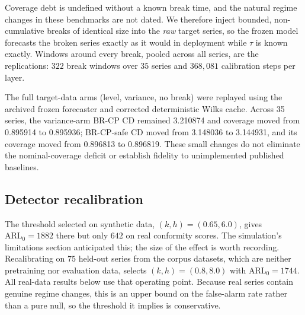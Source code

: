 \documentclass[10pt]{article}
\begin{document}
Coverage debt is undefined without a known break time, and the natural regime
changes in these benchmarks are not dated. We therefore inject bounded,
non-cumulative breaks of identical size into the \emph{raw} target series, so
the frozen model forecasts the broken series exactly as it would in deployment
while $\tau$ is known exactly. Windows around every break, pooled across all
series, are the replications: $322$ break windows over $35$ series and
$368{,}081$ calibration steps per layer.

The full target-data arms (level, variance, no break) were replayed using the archived frozen forecaster and corrected deterministic Wilks cache. Across 35 series, the variance-arm BR-CP CD remained 3.210874 and coverage moved from 0.895914 to 0.895936; BR-CP-safe CD moved from 3.148036 to 3.144931, and its coverage moved from 0.896813 to 0.896819. These small changes do not eliminate the nominal-coverage deficit or establish fidelity to unimplemented published baselines.

\subsection{Detector recalibration}

The threshold selected on synthetic data, $(k,h)=(0.65,6.0)$, gives
$\mathrm{ARL}_0 = 1882$ there but only $642$ on real conformity scores. The
simulation's limitations section anticipated this; the size of the effect is
worth recording. Recalibrating on $75$ held-out series from the corpus
datasets, which are neither pretraining nor evaluation data, selects
$(k,h)=(0.8,8.0)$ with $\mathrm{ARL}_0 = 1744$. All real-data results below use
that operating point. Because real series contain genuine regime changes, this
is an upper bound on the false-alarm rate rather than a pure null, so the
threshold it implies is conservative.
\end{document}
